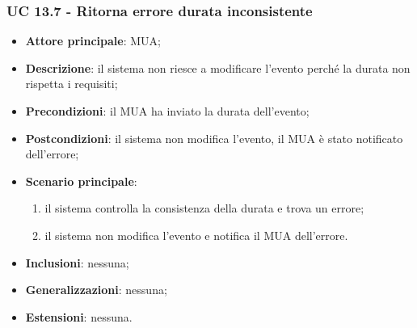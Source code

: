     \subsubsection{UC 13.7 - Ritorna errore durata inconsistente} \label{sec:UC13.7}
    \begin{itemize}
        \item \textbf{Attore principale}: MUA;
        \item \textbf{Descrizione}: il sistema non riesce a modificare l'evento perché la durata non rispetta i requisiti;
        \item \textbf{Precondizioni}: il MUA ha inviato la durata dell'evento;
        \item \textbf{Postcondizioni}: il sistema non modifica l'evento, il MUA è stato notificato dell'errore;
        \item \textbf{Scenario principale}:
            \begin{enumerate}
                \item il sistema controlla la consistenza della durata e trova un errore;
                \item il sistema non modifica l'evento e notifica il MUA dell'errore.
            \end{enumerate}
        \item \textbf{Inclusioni}: nessuna;
        \item \textbf{Generalizzazioni}: nessuna;
        \item \textbf{Estensioni}: nessuna.
    \end{itemize}
